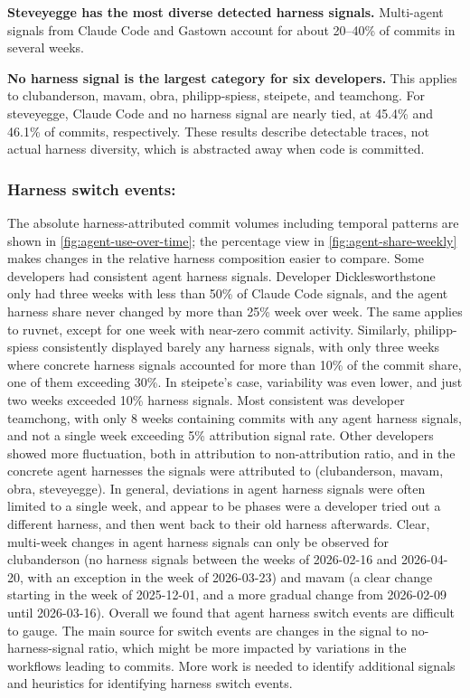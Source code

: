 \documentclass[smallextended]{svjour3}
\begin{document}
\textbf{Steveyegge has the most diverse detected harness signals.} Multi-agent
signals from Claude Code and Gastown account for about 20--40\% of commits in
several weeks.

\textbf{No harness signal is the largest category for six developers.} This
applies to clubanderson, mavam, obra, philipp-spiess, steipete, and teamchong.
For steveyegge, Claude Code and no harness signal are nearly tied, at 45.4\%
and 46.1\% of commits, respectively. These results describe detectable traces,
not actual harness diversity, which is abstracted away when code is committed.

\subsubsection{Harness switch events:} The absolute harness-attributed commit volumes including temporal patterns are shown in \autoref{fig:agent-use-over-time}; the percentage view in \autoref{fig:agent-share-weekly} makes changes in the relative harness composition easier to compare.
Some developers had consistent agent harness signals. Developer Dicklesworthstone only had three weeks with less than 50\% of Claude Code signals, and the agent harness share never changed by more than 25\% week over week. The same applies to ruvnet, except for one week with near-zero commit activity. Similarly, philipp-spiess consistently displayed barely any harness signals, with only three weeks where concrete harness signals accounted for more than 10\% of the commit share, one of them exceeding 30\%. In steipete's case, variability was even lower, and just two weeks exceeded 10\% harness signals.
Most consistent was developer teamchong, with only 8 weeks containing commits with any agent harness signals, and not a single week exceeding 5\% attribution signal rate.
Other developers showed more fluctuation, both in attribution to non-attribution ratio, and in the concrete agent harnesses the signals were attributed to (clubanderson, mavam, obra, steveyegge).
In general, deviations in agent harness signals were often limited to a single week, and appear to be phases were a developer tried out a different harness, and then went back to their old harness afterwards.
Clear, multi-week changes in agent harness signals can only be observed for clubanderson (no harness signals between the weeks of 2026-02-16 and 2026-04-20, with an exception in the week of 2026-03-23) and mavam (a clear change starting in the week of 2025-12-01, and a more gradual change from 2026-02-09 until 2026-03-16).
Overall we found that agent harness switch events are difficult to gauge. The main source for switch events are changes in the signal to no-harness-signal ratio, which might be more impacted by variations in the workflows leading to commits. More work is needed to identify additional signals and heuristics for identifying harness switch events.
\end{document}
